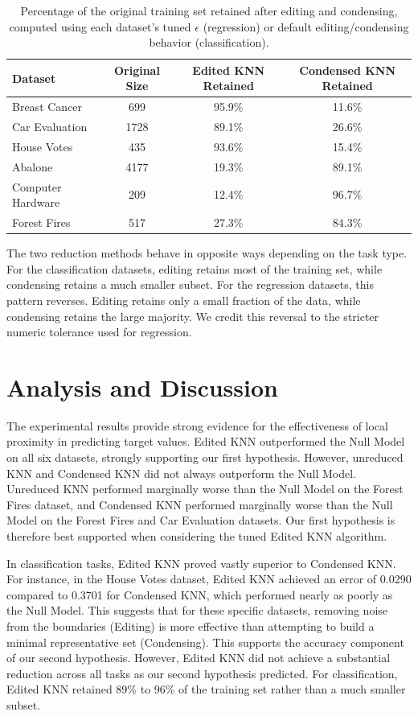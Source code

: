 \documentclass[twoside,11pt]{article}
\begin{document}
\begin{table}[h]
    \centering
    \begin{tabular}{lccc}
    \hline
    Dataset & Original Size & Edited KNN Retained & Condensed KNN Retained \\
    \hline
    Breast Cancer      & 699  & 95.9\% & 11.6\% \\
    Car Evaluation     & 1728 & 89.1\% & 26.6\% \\
    House Votes        & 435  & 93.6\% & 15.4\% \\
    Abalone            & 4177 & 19.3\% & 89.1\% \\
    Computer Hardware  & 209  & 12.4\% & 96.7\% \\
    Forest Fires       & 517  & 27.3\% & 84.3\% \\
    \hline
    \end{tabular}
    \caption{Percentage of the original training set retained after editing and condensing, computed using each dataset's tuned $\epsilon$ (regression) or default editing/condensing behavior (classification).}
    \label{tab:reduction-results}
\end{table}
The two reduction methods behave in opposite ways depending on the task type. For the classification datasets, editing retains most of the training set, while condensing retains a much smaller subset. For the regression datasets, this pattern reverses. Editing retains only a small fraction of the data, while condensing retains the large majority. We credit this reversal to the stricter numeric tolerance used for regression.

\section{Analysis and Discussion}
The experimental results provide strong evidence for the effectiveness of local proximity in predicting target values. Edited KNN outperformed the Null Model on all six datasets, strongly supporting our first hypothesis. However, unreduced KNN and Condensed KNN did not always outperform the Null Model. Unreduced KNN performed marginally worse than the Null Model on the Forest Fires dataset, and Condensed KNN performed marginally worse than the Null Model on the Forest Fires and Car Evaluation datasets. Our first hypothesis is therefore best supported when considering the tuned Edited KNN algorithm.

In classification tasks, Edited KNN proved vastly superior to Condensed KNN. For instance, in the House Votes dataset, Edited KNN achieved an error of 0.0290 compared to 0.3701 for Condensed KNN, which performed nearly as poorly as the Null Model. This suggests that for these specific datasets, removing noise from the boundaries (Editing) is more effective than attempting to build a minimal representative set (Condensing). This supports the accuracy component of our second hypothesis. However, Edited KNN did not achieve a substantial reduction across all tasks as our second hypothesis predicted. For classification, Edited KNN retained 89\% to 96\% of the training set rather than a much smaller subset.
\end{document}
